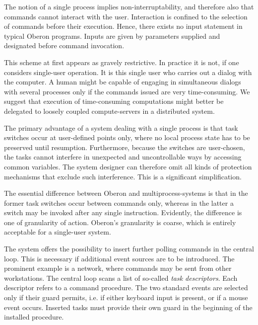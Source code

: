 The notion of a single process implies non-interruptability, and
therefore also that commands cannot interact with the
user. Interaction is confined to the selection of commands before
their execution. Hence, there exists no input statement in typical
Oberon programs. Inputs are given by parameters supplied and
designated before command invocation.

This scheme at first appears as gravely restrictive. In practice it is
not, if one considers single-user operation. It is this single user
who carries out a dialog with the computer. A human might be capable
of engaging in simultaneous dialogs with several processes only if the
commands issued are very time-consuming. We suggest that execution of
time-consuming computations might better be delegated to loosely
coupled compute-servers in a distributed system.

The primary advantage of a system dealing with a single process is
that task switches occur at user-defined points only, where no local
process state has to be preserved until resumption. Furthermore,
because the switches are user-chosen, the tasks cannot interfere in
unexpected and uncontrollable ways by accessing common variables. The
system designer can therefore omit all kinds of protection mechanisms
that exclude such interference. This is a significant simplification.

The essential difference between Oberon and multiprocess-systems is
that in the former task switches occur between commands only, whereas
in the latter a switch may be invoked after any single
instruction. Evidently, the difference is one of granularity of
action. Oberon's granularity is coarse, which is entirely acceptable
for a single-user system.

The system offers the possibility to insert further polling commands
in the central loop. This is necessary if additional event sources are
to be introduced. The prominent example is a network, where commands
may be sent from other workstations. The central loop scans a list of
so-called \emph{task descriptors}. Each descriptor refers to a command
procedure. The two standard events are selected only if their guard
permits, i.e. if either keyboard input is present, or if a mouse event
occurs. Inserted tasks must provide their own guard in the beginning
of the installed procedure.

